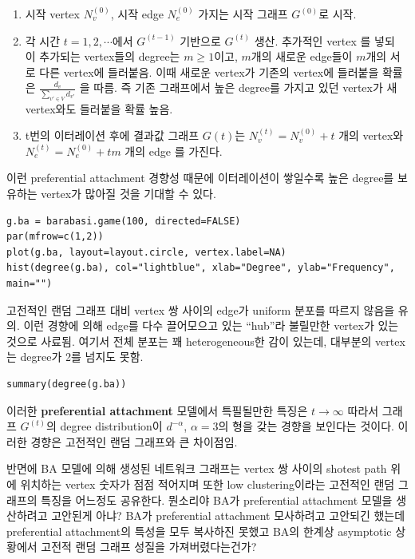 \documentclass[
]{book}
\begin{document}
{{{\begin{enumerate}
\def\labelenumi{\arabic{enumi}.}
\item
  시작 vertex \(N_v^{(0)}\), 시작 edge \(N_e^{(0)}\) 가지는 시작 그래프 \(G^{(0)}\)로 시작.
\item
  각 시간 \(t = 1, 2, \cdots\)에서 \(G^{(t-1)}\) 기반으로 \(G^{(t)}\) 생산. 추가적인 vertex 를 넣되 이 추가되는 vertex들의 degree는 \(m \ge 1\)이고, \(m\)개의 새로운 edge들이 \(m\)개의 서로 다른 vertex에 들러붙음. 이때 새로운 vertex가 기존의 vertex에 들러붙을 확률은 \(\frac{d_v}{\sum_{v' \in V}d_{v'}}\) 을 따름. 즉 기존 그래프에서 높은 degree를 가지고 있던 vertex가 새 vertex와도 들러붙을 확률 높음.
\item
  t번의 이터레이션 후에 결과값 그래프 \(G(t)\)는 \(N_v^{(t)} = N_v^{(0)} + t\) 개의 vertex와 \(N_e^{(t)} = N_e^{(0)} + tm\) 개의 edge 를 가진다.
\end{enumerate}

이런 preferential attachment 경향성 때문에 이터레이션이 쌓일수록 높은 degree를 보유하는 vertex가 많아질 것을 기대할 수 있다.

\begin{verbatim}
g.ba = barabasi.game(100, directed=FALSE)
par(mfrow=c(1,2))
plot(g.ba, layout=layout.circle, vertex.label=NA)
hist(degree(g.ba), col="lightblue", xlab="Degree", ylab="Frequency", main="")
\end{verbatim}

고전적인 랜덤 그래프 대비 vertex 쌍 사이의 edge가 uniform 분포를 따르지 않음을 유의. 이런 경향에 의해 edge를 다수 끌어모으고 있는 ``hub''라 불릴만한 vertex가 있는 것으로 사료됨. 여기서 전체 분포는 꽤 heterogeneous한 감이 있는데, 대부분의 vertex는 degree가 2를 넘지도 못함.

\begin{verbatim}
summary(degree(g.ba))
\end{verbatim}

이러한 \textbf{preferential attachment} 모델에서 특필될만한 특징은 \(t \rightarrow \infty\) 따라서 그래프 \(G^{(t)}\)의 degree distribution이 \(d^{-\alpha}\), \(\alpha = 3\)의 형을 갖는 경향을 보인다는 것이다. 이러한 경향은 고전적인 랜덤 그래프와 큰 차이점임.

반면에 BA 모델에 의해 생성된 네트워크 그래프는 vertex 쌍 사이의 shotest path 위에 위치하는 vertex 숫자가 점점 적어지며 또한 low clustering이라는 고전적인 랜덤 그래프의 특징을 어느정도 공유한다. 뭔소리야 BA가 preferential attachment 모델을 생산하려고 고안된게 아냐? BA가 preferential attachment 모사하려고 고안되긴 했는데 preferential attachment의 특성을 모두 복사하진 못했고 BA의 한계상 asymptotic 상황에서 고전적 랜덤 그래프 성질을 가져버렸다는건가?

}}}
\end{document}
